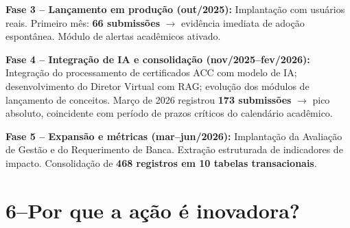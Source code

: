 \documentclass[12pt,a4paper]{article}
\begin{document}
\textbf{Fase 3 -- Lançamento em produção (out/2025):} Implantação com usuários reais.
Primeiro mês: \textbf{66 submissões} $\rightarrow$ evidência imediata de adoção espontânea.
Módulo de alertas acadêmicos ativado.

\textbf{Fase 4 -- Integração de IA e consolidação (nov/2025--fev/2026):} Integração
do processamento de certificados ACC com modelo de IA; desenvolvimento do Diretor
Virtual com RAG; evolução dos módulos de lançamento de conceitos. Março de 2026
registrou \textbf{173 submissões} $\rightarrow$ pico absoluto, coincidente com período de prazos
críticos do calendário acadêmico.

\textbf{Fase 5 -- Expansão e métricas (mar--jun/2026):} Implantação da Avaliação de
Gestão e do Requerimento de Banca. Extração estruturada de indicadores de impacto.
Consolidação de \textbf{468 registros em 10 tabelas transacionais}.

\section{6\;–\;Por que a ação é inovadora?}
\end{document}
